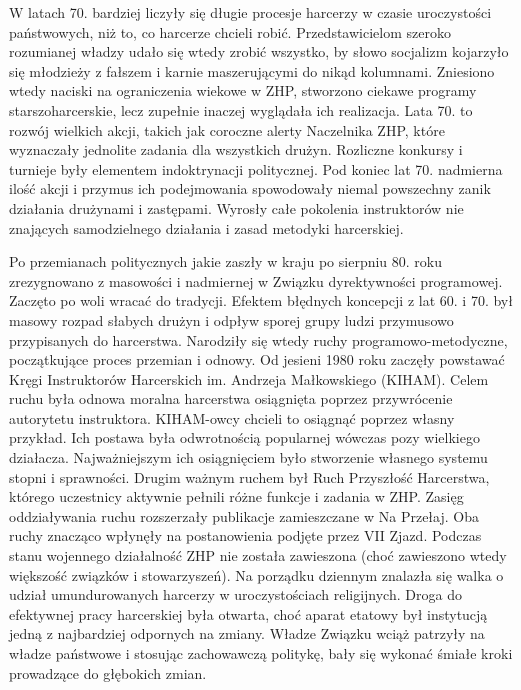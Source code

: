 W latach 70. bardziej liczyły się długie procesje harcerzy w czasie uroczystości państwowych, niż to, co harcerze chcieli robić. Przedstawicielom szeroko rozumianej władzy udało się wtedy zrobić wszystko, by słowo socjalizm kojarzyło się młodzieży z fałszem i karnie maszerującymi do nikąd kolumnami. Zniesiono wtedy naciski na ograniczenia wiekowe w ZHP, stworzono ciekawe programy starszoharcerskie, lecz zupełnie inaczej wyglądała ich realizacja. Lata 70. to rozwój wielkich akcji, takich jak coroczne alerty Naczelnika ZHP, które wyznaczały jednolite zadania dla wszystkich drużyn. Rozliczne konkursy i turnieje były elementem indoktrynacji politycznej. Pod koniec lat 70. nadmierna ilość akcji i przymus ich podejmowania spowodowały niemal powszechny zanik działania drużynami i zastępami. Wyrosły całe pokolenia instruktorów nie znających samodzielnego działania i zasad metodyki harcerskiej.

Po przemianach politycznych jakie zaszły w kraju po sierpniu 80. roku zrezygnowano z masowości i nadmiernej w Związku dyrektywności programowej. Zaczęto po woli wracać do tradycji. Efektem błędnych koncepcji z lat 60. i 70. był masowy rozpad słabych drużyn i odpływ sporej grupy ludzi przymusowo przypisanych do harcerstwa. Narodziły się wtedy ruchy programowo-metodyczne, początkujące proces przemian i odnowy. Od jesieni 1980 roku zaczęły powstawać Kręgi Instruktorów Harcerskich im. Andrzeja Małkowskiego (KIHAM). Celem ruchu była odnowa moralna harcerstwa osiągnięta poprzez przywrócenie autorytetu instruktora. KIHAM-owcy chcieli to osiągnąć poprzez własny przykład. Ich postawa była odwrotnością popularnej wówczas pozy wielkiego działacza. Najważniejszym ich osiągnięciem było stworzenie własnego systemu stopni i sprawności. Drugim ważnym ruchem był Ruch Przyszłość Harcerstwa, którego uczestnicy aktywnie pełnili różne funkcje i zadania w ZHP. Zasięg oddziaływania ruchu rozszerzały publikacje zamieszczane w Na Przełaj. Oba ruchy znacząco wpłynęły na postanowienia podjęte przez VII Zjazd. Podczas stanu wojennego działalność ZHP nie została zawieszona (choć zawieszono wtedy większość związków i stowarzyszeń). Na porządku dziennym znalazła się walka o udział umundurowanych harcerzy w uroczystościach religijnych. Droga do efektywnej pracy harcerskiej była otwarta, choć aparat etatowy był instytucją jedną z najbardziej odpornych na zmiany. Władze Związku wciąż patrzyły na władze państwowe i stosując zachowawczą politykę, bały się wykonać śmiałe kroki prowadzące do głębokich zmian.

